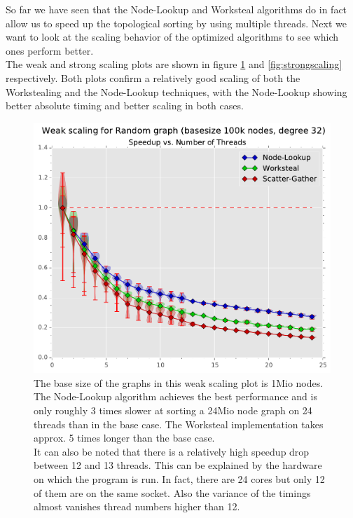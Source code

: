 So far we have seen that the Node-Lookup and Worksteal algorithms do in fact allow us to speed up the topological sorting by using multiple threads.
Next we want to look at the scaling behavior of the optimized algorithms to see which ones perform better. \\
The weak and strong scaling plots are shown in figure \ref{fig:weakscaling} and \ref{fig:strongscaling} respectively.
Both plots confirm a relatively good scaling of both the Workstealing and the Node-Lookup techniques, with the Node-Lookup showing better absolute timing and better scaling in both cases. \\
%
\begin{figure}[ht]
	\centering
	\includegraphics[width=\columnwidth]{plots/weakscaling_gtRANDOMLIN32_n1000000_deg32.pdf}
	\caption{The base size of the graphs in this weak scaling plot is 1Mio nodes.
		The Node-Lookup algorithm achieves the best performance and is only roughly 3 times slower at sorting a 24Mio node graph on 24 threads than in the base case. The Worksteal implementation takes approx. 5 times longer than the base case. \\
	It can also be noted that there is a relatively high speedup drop between 12 and 13 threads.
	This can be explained by the hardware on which the program is run. In fact, there are 24 cores but only 12 of them are on the same socket.
	Also the variance of the timings almost vanishes thread numbers higher than 12.
}
	\label{fig:weakscaling}
\end{figure}
